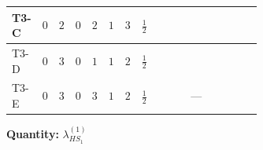 \documentclass[8pt]{article}
\begin{document}
\begin{landscape}
\begin{longtable}{@{}llcccccc >{\raggedright\arraybackslash}p{0.21\linewidth} >{\raggedright\arraybackslash}p{0.21\linewidth} >{\raggedright\arraybackslash}p{0.21\linewidth}@{}}
\midrule
T3-C & $0$ & $2$ & $0$ & $2$ & $1$ & $3$ & $\frac{1}{2}$ & \scriptsize\adjustbox{max width=\linewidth}{$\begin{gathered} -\frac{3 {g_1}^2 {\lambda_{HS_1}^{(1)}}}{2}\end{gathered}$} & \scriptsize\adjustbox{max width=\linewidth}{$\begin{gathered} +4 {\lambda_{12}^{(1)}} {\lambda_{HS_2}^{(1)}}\end{gathered}$} & \scriptsize\adjustbox{max width=\linewidth}{$\begin{gathered} +6 {\lambda_1} {\lambda_{HS_1}^{(1)}}\end{gathered}$} \\
\midrule
T3-D & $0$ & $3$ & $0$ & $1$ & $1$ & $2$ & $\frac{1}{2}$ & \scriptsize\adjustbox{max width=\linewidth}{$\begin{gathered} -\frac{3 {g_1}^2 {\lambda_{HS_1}^{(1)}}}{2}\end{gathered}$} & \scriptsize\adjustbox{max width=\linewidth}{$\begin{gathered} +2 {\lambda_{12}^{(1)}} {\lambda_{HS_2}^{(1)}}\end{gathered}$} & \scriptsize\adjustbox{max width=\linewidth}{$\begin{gathered} +6 {\lambda_1} {\lambda_{HS_1}^{(1)}}\end{gathered}$} \\
\midrule
T3-E & $0$ & $3$ & $0$ & $3$ & $1$ & $2$ & $\frac{1}{2}$ & \scriptsize\adjustbox{max width=\linewidth}{$\begin{gathered} -\frac{3 {g_1}^2 {\lambda_{HS_1}^{(1)}}}{2}\end{gathered}$} & --- & \scriptsize\adjustbox{max width=\linewidth}{$\begin{gathered} +6 {\lambda_1} {\lambda_{HS_1}^{(1)}}\end{gathered}$} \\
\midrule
\bottomrule
\end{longtable}
\clearpage
\noindent\textbf{Quantity: }$\lambda_{HS_1}^{(1)}$\par\smallskip

\end{landscape}
\end{document}
